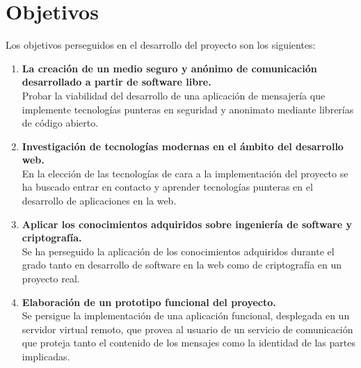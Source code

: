 \chapter{Objetivos}

Los objetivos perseguidos en el desarrollo del proyecto son los siguientes:

\begin{enumerate}  
	\item  \textbf{La creación de un medio seguro y anónimo de comunicación desarrollado a partir de software libre.} \\
			Probar la viabilidad del desarrollo de una aplicación de mensajería que implemente tecnologías punteras en seguridad y anonimato mediante librerías de código abierto.
			
	\item  \textbf{Investigación de tecnologías modernas en el ámbito del desarrollo web.} \\
			En la elección de las tecnologías de cara a la implementación del proyecto se ha buscado entrar en contacto y aprender tecnologías punteras en el desarrollo de aplicaciones en la web. 
			
	\item \textbf{Aplicar los conocimientos adquiridos sobre ingeniería de software y criptografía.} \\ 
			Se ha perseguido la aplicación de los conocimientos adquiridos durante el grado tanto en desarrollo de software en la web como de criptografía en un proyecto real.
						
	\item  \textbf{Elaboración de un prototipo funcional del proyecto.} \\
			Se persigue la implementación de una aplicación funcional, desplegada en un servidor virtual remoto, que provea al usuario de un servicio de comunicación que proteja tanto el contenido de los mensajes como la identidad de las partes implicadas.
\end{enumerate}